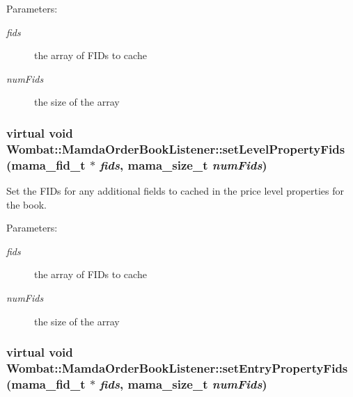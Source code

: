\begin{Desc}
\item[Parameters:]
\begin{description}
\item[{\em fids}]the array of FIDs to cache \item[{\em num\-Fids}]the size of the array \end{description}
\end{Desc}
\hypertarget{classWombat_1_1MamdaOrderBookListener_906cf0d645735a81be277fa4db1d1aaa}{
\subsubsection[setLevelPropertyFids]{\setlength{\rightskip}{0pt plus 5cm}virtual void Wombat::Mamda\-Order\-Book\-Listener::set\-Level\-Property\-Fids (mama\_\-fid\_\-t $\ast$ {\em fids}, mama\_\-size\_\-t {\em num\-Fids})}}
\label{classWombat_1_1MamdaOrderBookListener_906cf0d645735a81be277fa4db1d1aaa}


Set the FIDs for any additional fields to cached in the price level properties for the book. 

\begin{Desc}
\item[Parameters:]
\begin{description}
\item[{\em fids}]the array of FIDs to cache \item[{\em num\-Fids}]the size of the array \end{description}
\end{Desc}
\hypertarget{classWombat_1_1MamdaOrderBookListener_33244f9f7e6a9d1afe530669ecc39ea0}{
\subsubsection[setEntryPropertyFids]{\setlength{\rightskip}{0pt plus 5cm}virtual void Wombat::Mamda\-Order\-Book\-Listener::set\-Entry\-Property\-Fids (mama\_\-fid\_\-t $\ast$ {\em fids}, mama\_\-size\_\-t {\em num\-Fids})}}
\label{classWombat_1_1MamdaOrderBookListener_33244f9f7e6a9d1afe530669ecc39ea0}


